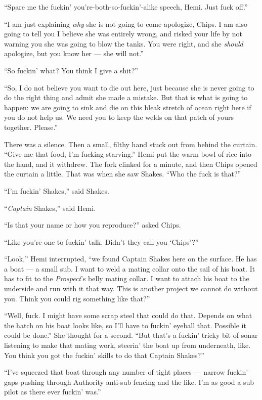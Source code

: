 \documentclass[
]{scrbook}
\begin{document}
``Spare me the fuckin' you're-both-so-fuckin'-alike speech, Hemi. Just
fuck off.''

``I am just explaining \emph{why} she is not going to come apologize,
Chips. I am also going to tell you I believe she was entirely wrong, and
risked your life by not warning you she was going to blow the tanks. You
were right, and she \emph{should} apologize, but you know her --- she
will not.''

``So fuckin' what? You think I give a shit?''

``So, I do not believe you want to die out here, just because she is
never going to do the right thing and admit she made a mistake. But that
is what is going to happen: we are going to sink and die on this bleak
stretch of ocean right here if you do not help us. We need you to keep
the welds on that patch of yours together. Please.''

There was a silence. Then a small, filthy hand stuck out from behind the
curtain. ``Give me that food, I'm fucking starving.'' Hemi put the warm
bowl of rice into the hand, and it withdrew. The fork clinked for a
minute, and then Chips opened the curtain a little. That was when she
saw Shakes. ``Who the fuck is that?''

``I'm fuckin' Shakes,'' said Shakes.

``\emph{Captain} Shakes,'' said Hemi.

``Is that your name or how you reproduce?'' asked Chips.

``Like you're one to fuckin' talk. Didn't they call you `Chips'?''

``Look,'' Hemi interrupted, ``we found Captain Shakes here on the
surface. He has a boat --- a small sub. I want to weld a mating collar
onto the sail of his boat. It has to fit to the \emph{Prospect}'s belly
mating collar. I want to attach his boat to the underside and run with
it that way. This is another project we cannot do without you. Think you
could rig something like that?''

``Well, fuck. I might have some scrap steel that could do that. Depends
on what the hatch on his boat looks like, so I'll have to fuckin'
eyeball that. Possible it could be done.'' She thought for a second.
``But that's a fuckin' tricky bit of sonar listening to make that mating
work, steerin' the boat up from underneath, like. You think you got the
fuckin' skills to do that Captain Shakes?''

``I've squeezed that boat through any number of tight places --- narrow
fuckin' gaps pushing through Authority anti-sub fencing and the like.
I'm as good a sub pilot as there ever fuckin' was.''
\end{document}
